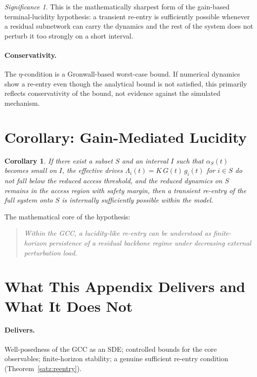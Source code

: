 \documentclass[11pt,a4paper]{article}
\theoremstyle{plain}
\newtheorem{corollary}[theorem]{Corollary}
\theoremstyle{definition}
\theoremstyle{remark}
\newtheorem*{significance}{Significance}
\begin{document}
\begin{significance}
This is the mathematically sharpest form of the gain-based terminal-lucidity hypothesis: a transient re-entry is sufficiently possible whenever a residual subnetwork can carry the dynamics and the rest of the system does not perturb it too strongly on a short interval.
\end{significance}

\paragraph{Conservativity.}
The $\eta$-condition is a Gronwall-based worst-case bound. If numerical dynamics show a re-entry even though the analytical bound is not satisfied, this primarily reflects conservativity of the bound, not evidence against the simulated mechanism.


\section{Corollary: Gain-Mediated Lucidity}

\begin{corollary}
\label{kor:lucidity}
If there exist a subset $S$ and an interval $I$ such that $\alpha_S(t)$ becomes small on $I$, the effective drives $\Lambda_i(t) = K\,G(t)\,g_i(t)$ for $i \in S$ do not fall below the reduced access threshold, and the reduced dynamics on $S$ remains in the access region with safety margin, then a transient re-entry of the full system onto $S$ is internally sufficiently possible within the model.
\end{corollary}

The mathematical core of the hypothesis:

\begin{quote}
\itshape
Within the GCC, a lucidity-like re-entry can be understood as finite-horizon persistence of a residual backbone regime under decreasing external perturbation load.
\end{quote}


\section{What This Appendix Delivers and What It Does Not}

\paragraph{Delivers.}
Well-posedness of the GCC as an SDE; controlled bounds for the core observables; finite-horizon stability; a genuine sufficient re-entry condition (Theorem~\ref{satz:reentry}).
\end{document}
